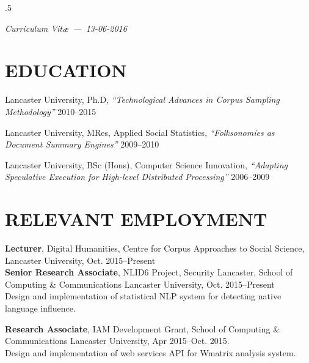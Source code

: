 \documentclass{res}
\begin{document}
\thispagestyle{empty} %
\address{\\
\texttt{<steve@stephenwattam.com>}\\
\texttt{http://stephenwattam.com/}}


\begin{resume}
\vspace{0.2in}
\moveleft.5\sectionwidth\centerline{\it Curriculum Vit\ae~---~13-06-2016}

\section{EDUCATION}
\vspace{0.1in}


    Lancaster University, Ph.D,
    \textit{``Technological Advances in Corpus Sampling Methodology''}
    2010--2015

    Lancaster University, MRes,
    Applied Social Statistics,
    \textit{``Folksonomies as Document Summary \mbox{Engines}''}
    2009--2010

    Lancaster University, BSc (Hons),
    Computer Science Innovation,
    \textit{``Adapting Speculative Execution for High-level Distributed Processing''}
    2006--2009



\section{RELEVANT EMPLOYMENT}
\vspace{0.1in}

    {\bf Lecturer},
    Digital Humanities, Centre for Corpus Approaches to Social Science,
    Lancaster University,
    Oct. 2015--Present\\ 
    
    {\bf Senior Research Associate},
    NLID6 Project, Security Lancaster, School of Computing \& Communications
    Lancaster University,
    Oct. 2015--Present\\
    Design and implementation of statistical NLP system for detecting native language influence.

    {\bf Research Associate},
    IAM Development Grant, School of Computing \& Communications
    Lancaster University,
    Apr 2015--Oct. 2015.\\
    Design and implementation of web services API for Wmatrix analysis system.


\end{resume}
\end{document}
